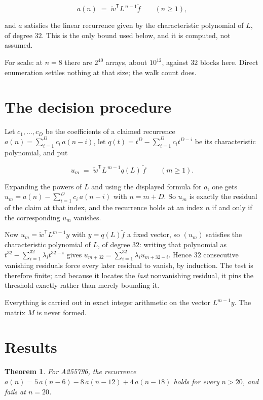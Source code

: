 \documentclass[11pt]{article}
\newtheorem{theorem}{Theorem}
\theoremstyle{definition}
\begin{document}
\[a(n) \;=\; \tilde w^{\mathsf T} L^{\,n-1} \tilde f \qquad (n \ge 1),\]

and $a$ satisfies the linear recurrence given by the characteristic polynomial of $L$, of degree $32$. This is the only bound used below, and it is computed, not assumed.

For scale: at $n = 8$ there are $2^{40}$ arrays, about $10^{12}$, against $32$ blocks here. Direct enumeration settles nothing at that size; the walk count does.

\section{The decision procedure}

Let $c_1,\dots,c_D$ be the coefficients of a claimed recurrence $a(n) = \sum_{i=1}^{D} c_i\,a(n-i)$, let $q(t) = t^{D} - \sum_{i=1}^{D} c_i t^{D-i}$ be its characteristic polynomial, and put

\[u_m \;=\; \tilde w^{\mathsf T} L^{\,m-1} q(L)\,\tilde f \qquad (m \ge 1).\]

Expanding the powers of $L$ and using the displayed formula for $a$, one gets $u_m = a(n) - \sum_{i=1}^{D} c_i\,a(n-i)$ with $n = m + D$. So $u_m$ is exactly the residual of the claim at that index, and the recurrence holds at an index $n$ if and only if the corresponding $u_m$ vanishes.

Now $u_m = \tilde w^{\mathsf T} L^{m-1} y$ with $y = q(L)\tilde f$ a fixed vector, so $(u_m)$ satisfies the characteristic polynomial of $L$, of degree $32$: writing that polynomial as $t^{32} - \sum_{i=1}^{32} \lambda_i t^{32-i}$ gives $u_{m+32} = \sum_{i=1}^{32} \lambda_i u_{m+32-i}$. Hence $32$ consecutive vanishing residuals force every later residual to vanish, by induction. The test is therefore finite; and because it locates the {\itshape last} nonvanishing residual, it pins the threshold exactly rather than merely bounding it.

Everything is carried out in exact integer arithmetic on the vector $L^{m-1}y$. The matrix $M$ is never formed.

\section{Results}

\begin{theorem} For A255796, the recurrence $a(n) = 5\,a(n-6) - 8\,a(n-12) + 4\,a(n-18)$ holds for every $n > 20$, and fails at $n = 20$.\end{theorem}
\end{document}
